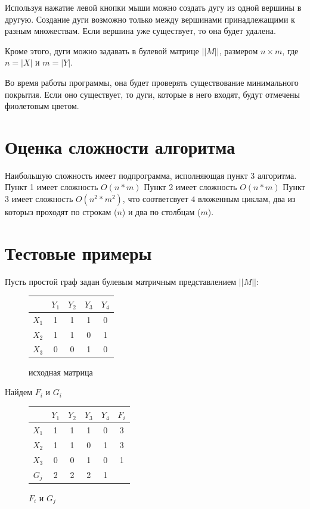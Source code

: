 \documentclass[12pt]{article}
\begin{document}
Используя нажатие левой кнопки мыши можно создать дугу из
одной вершины в другую. Создание дуги возможно только между вершинами
принадлежащими к разным множествам. Если вершина уже существует, то
она будет удалена.

Кроме этого, дуги можно задавать в булевой матрице $||M||$, размером $n \times m$,
где $n = |X|$ и $m = |Y|$.

Во время работы программы, она будет проверять существование
минимального покрытия. Если оно существует, то дуги, которые в него входят,
будут отмечены фиолетовым цветом.

\section{Оценка сложности алгоритма}

Наибольшую сложность имеет подпрограмма, исполняющая
пункт 3 алгоритма. Пункт 1 имеет сложность $O(n * m)$
Пункт 2 имеет сложность $O(n * m)$
Пункт 3 имеет сложность $O(n^2 * m^2)$, что соответсвует $4$
вложенным циклам, два из которыз проходят по строкам ($n$) и
два по столбцам ($m$).

\section{Тестовые примеры}

Пусть простой граф задан булевым матричным представлением $||M||$:

\begin{figure}[H]
    \centering
    \begin{tabular}{ c|c|c|c|c| }
              & $Y_1$ & $Y_2$ & $Y_3$ & $Y_4$ \\
        \hline
        $X_1$ & 1     & 1     & 1     & 0     \\
        \hline
        $X_2$ & 1     & 1     & 0     & 1     \\
        \hline
        $X_3$ & 0     & 0     & 1     & 0     \\
        \hline
    \end{tabular}
    \label{fig:table1}
    \caption{исходная матрица}
\end{figure}

Найдем $F_i$ и $G_i$

\begin{figure}[H]
    \centering
    \begin{tabular}{ c|c|c|c|c|c }
              & $Y_1$ & $Y_2$ & $Y_3$ & $Y_4$ & $F_i$ \\
        \hline
        $X_1$ & 1     & 1     & 1     & 0     & 3     \\
        \hline
        $X_2$ & 1     & 1     & 0     & 1     & 3     \\
        \hline
        $X_3$ & 0     & 0     & 1     & 0     & 1     \\
        \hline
        $G_j$ & 2     & 2     & 2     & 1     &
    \end{tabular}
    \label{fig:FiGj}
    \caption{$F_i$ и $G_j$}
\end{figure}
\end{document}
